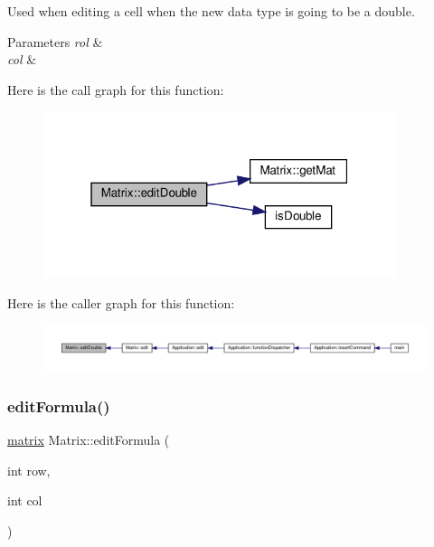 Used when editing a cell when the new data type is going to be a double. 
\begin{DoxyParams}{Parameters}
{\em rol} & \\
\hline
{\em col} & \\
\hline
\end{DoxyParams}
Here is the call graph for this function\+:\nopagebreak
\begin{figure}[H]
\begin{center}
\leavevmode
\includegraphics[width=292pt]{class_matrix_a147d3813e96ef757fb0d5ff65e5f97ef_cgraph}
\end{center}
\end{figure}
Here is the caller graph for this function\+:\nopagebreak
\begin{figure}[H]
\begin{center}
\leavevmode
\includegraphics[width=350pt]{class_matrix_a147d3813e96ef757fb0d5ff65e5f97ef_icgraph}
\end{center}
\end{figure}
\mbox{\label{class_matrix_af3d26e46fcec1a98380b1af04f008f22}} 
\subsubsection{\texorpdfstring{edit\+Formula()}{editFormula()}}
{\footnotesize\ttfamily \hyperlink{formula_8h_a869e2a5deeb3daa4c82d6bc91cf20d92}{matrix} Matrix\+::edit\+Formula (\begin{DoxyParamCaption}\item[{int}]{row,  }\item[{int}]{col }\end{DoxyParamCaption})\hspace{0.3cm}{\ttfamily [private]}}

